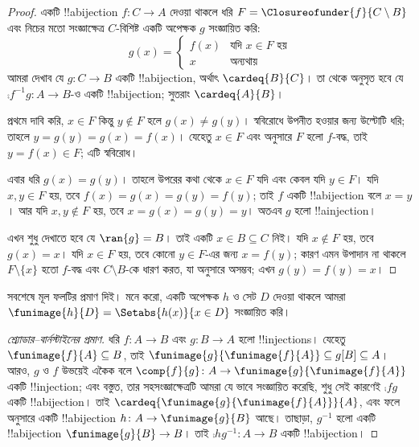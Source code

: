 \documentclass[../../../include/open-logic-section]{subfiles}
\begin{document}
\begin{proof}
একটি !!a{bijection} $f \colon C \to A$ দেওয়া থাকলে ধরি $F =
\Closureofunder{f}{C \setminus B}$ এবং নিচের মতো সংজ্ঞাক্ষেত্র $C$-বিশিষ্ট একটি অপেক্ষক $g$ সংজ্ঞায়িত করি:
\[
	g(x) =
	\begin{cases}
			f(x) &\text{যদি $x \in F$ হয়}\\
			x & \text{অন্যথায়}
	\end{cases}
\]
আমরা দেখাব যে $g\colon C \to B$ একটি !!a{bijection}, অর্থাৎ $\cardeq{B}{C}$। তা থেকে অনুসৃত হবে যে $\comp{f^{-1}}{g}\colon A \to B$-ও একটি !!a{bijection}; সুতরাং $\cardeq{A}{B}$।

প্রথমে দাবি করি, $x \in F$ কিন্তু $y\notin F$ হলে $g(x) \neq
g(y)$। স্ববিরোধে উপনীত হওয়ার জন্য উল্টোটি ধরি; তাহলে $y = g(y) = g(x) =
f(x)$। যেহেতু $x \in F$ এবং  অনুসারে $F$ হলো $f$-বদ্ধ, তাই $y = f(x) \in F$; এটি স্ববিরোধ।

এবার ধরি $g(x) = g(y)$। তাহলে উপরের কথা থেকে $x \in F$ যদি এবং কেবল যদি $y \in F$। যদি $x, y \in F$ হয়, তবে $f(x) = g (x) = g(y) = f(y)$; তাই $f$ একটি !!a{bijection} বলে $x = y$। আর যদি $x, y \notin F$ হয়, তবে $x = g(x) =
g(y) = y$। অতএব $g$ হলো !!a{injection}।

এখন শুধু দেখাতে হবে যে $\ran{g} = B$। তাই একটি $x \in B \subseteq C$ নিই। যদি $x \notin F$ হয়, তবে $g(x) = x$। যদি $x \in F$ হয়, তবে কোনো $y \in F$-এর জন্য $x = f(y)$; কারণ এমন উপাদান না থাকলে $F \setminus \{x\}$ হতো $f$-বদ্ধ এবং $C\setminus B$-কে ধারণ করত, যা  অনুসারে অসম্ভব; এখন $g(y) = f(y) = x$।
\end{proof}

সবশেষে মূল ফলটির প্রমাণ দিই। মনে করো, একটি অপেক্ষক $h$ ও সেট $D$ দেওয়া থাকলে আমরা $\funimage{h}{D} = \Setabs{h(x)}{x
\in D}$ সংজ্ঞায়িত করি।

\begin{proof}[শ্র্যোডার--বার্নস্টাইনের প্রমাণ] ধরি $f \colon A \to B$
এবং $g \colon B \to A$ হলো !!{injection}s। যেহেতু $\funimage{f}{A}
\subseteq B$, তাই $\funimage{g}{\funimage{f}{A}} \subseteq
g[B] \subseteq A$। আরও, $g$ ও $f$ উভয়েই একৈক বলে $\comp{f}{g} \colon A \to
\funimage{g}{\funimage{f}{A}}$ একটি !!{injection}; এবং বস্তুত, তার সহসংজ্ঞাক্ষেত্রটি আমরা যে ভাবে সংজ্ঞায়িত করেছি, শুধু সেই কারণেই $\comp{f}{g}$ একটি !!a{bijection}। তাই
$\cardeq{\funimage{g}{\funimage{f}{A}}}{A}$, এবং ফলে
 অনুসারে একটি !!a{bijection} $h \colon A \to
\funimage{g}{B}$ আছে। তাছাড়া, $g^{-1}$ হলো একটি !!a{bijection}
$\funimage{g}{B} \to B$। তাই $\comp{h}{g^{-1}} \colon A \to B$ একটি !!a{bijection}।
\end{proof}
\end{document}
